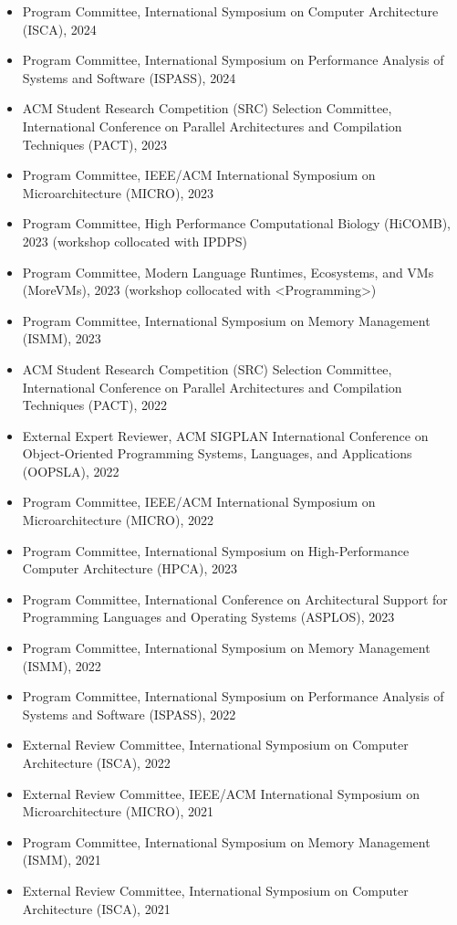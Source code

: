 \documentclass[singlecolumn,singlespace,11pt,a4paper]{article}
\begin{document}
\begin{itemize}
\item Program Committee, International Symposium on Computer Architecture (ISCA), 2024
\item Program Committee, International Symposium on Performance Analysis of Systems and Software (ISPASS), 2024
\item ACM Student Research Competition (SRC) Selection Committee, International Conference on Parallel Architectures and Compilation Techniques (PACT), 2023
\item Program Committee, IEEE/ACM International Symposium on Microarchitecture (MICRO), 2023
\item Program Committee, High Performance Computational Biology (HiCOMB), 2023 (workshop collocated with IPDPS)
\item Program Committee, Modern Language Runtimes, Ecosystems, and VMs (MoreVMs), 2023 (workshop collocated with <Programming>) 
\item Program Committee, International Symposium on Memory Management (ISMM), 2023
\item ACM Student Research Competition (SRC) Selection Committee, International Conference on Parallel Architectures and Compilation Techniques (PACT), 2022
\item External Expert Reviewer, ACM SIGPLAN International Conference on Object-Oriented Programming Systems, Languages, and Applications (OOPSLA), 2022
\item Program Committee, IEEE/ACM International Symposium on Microarchitecture (MICRO), 2022
\item Program Committee, International Symposium on High-Performance Computer Architecture (HPCA), 2023
\item Program Committee, International Conference on Architectural Support for Programming Languages and Operating Systems (ASPLOS), 2023
\item Program Committee, International Symposium on Memory Management (ISMM), 2022
\item Program Committee, International Symposium on Performance Analysis of Systems and Software (ISPASS), 2022
\item External Review Committee, International Symposium on Computer Architecture (ISCA), 2022
\item External Review Committee, IEEE/ACM International Symposium on Microarchitecture (MICRO), 2021
\item Program Committee, International Symposium on Memory Management (ISMM), 2021
\item External Review Committee, International Symposium on Computer Architecture (ISCA), 2021

\end{itemize}
\end{document}
